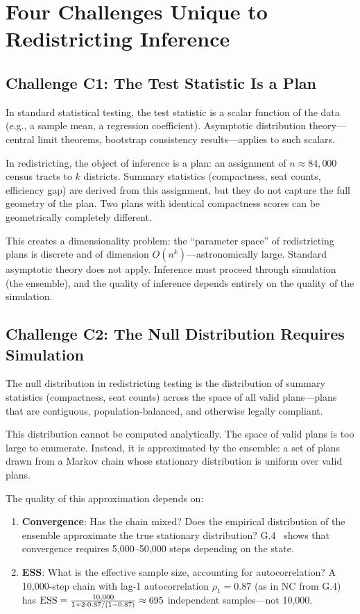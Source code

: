 \section{Four Challenges Unique to Redistricting Inference}
\label{sec:challenges}

\subsection{Challenge C1: The Test Statistic Is a Plan}
\label{sec:challenge1}

In standard statistical testing, the test statistic is a scalar function
of the data (e.g., a sample mean, a regression coefficient).
Asymptotic distribution theory---central limit theorems, bootstrap
consistency results---applies to such scalars.

In redistricting, the object of inference is a plan: an assignment of
$n \approx 84{,}000$ census tracts to $k$ districts.
Summary statistics (compactness, seat counts, efficiency gap) are derived
from this assignment, but they do not capture the full geometry of the plan.
Two plans with identical compactness scores can be geometrically
completely different.

This creates a dimensionality problem: the ``parameter space'' of
redistricting plans is discrete and of dimension $O(n^k)$---astronomically
large.
Standard asymptotic theory does not apply.
Inference must proceed through simulation (the ensemble), and the quality
of inference depends entirely on the quality of the simulation.

\subsection{Challenge C2: The Null Distribution Requires Simulation}
\label{sec:challenge2}

The null distribution in redistricting testing is the distribution of
summary statistics (compactness, seat counts) across the space of all
valid plans---plans that are contiguous, population-balanced, and
otherwise legally compliant.

This distribution cannot be computed analytically.
The space of valid plans is too large to enumerate.
Instead, it is approximated by the ensemble: a set of plans drawn from
a Markov chain whose stationary distribution is uniform over valid plans.

The quality of this approximation depends on:
\begin{enumerate}
\item \textbf{Convergence}: Has the chain mixed? Does the empirical
  distribution of the ensemble approximate the true stationary distribution?
  G.4~\citep{g4paper} shows that convergence requires 5,000--50,000
  steps depending on the state.
\item \textbf{ESS}: What is the effective sample size, accounting for
  autocorrelation?
  A 10,000-step chain with lag-1 autocorrelation $\rho_1 = 0.87$
  (as in NC from G.4) has $\mathrm{ESS} = \frac{10{,}000}{1 + 2 \cdot 0.87 /
  (1 - 0.87)} \approx 695$ independent samples---not 10,000.
\end{enumerate}


